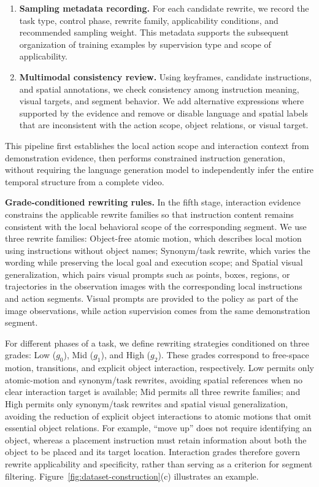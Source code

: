 \begin{enumerate}
\item \textbf{Sampling metadata recording.} For each candidate rewrite, we record the task type,
control phase, rewrite family, applicability conditions, and recommended sampling weight. This
metadata supports the subsequent organization of training examples by supervision type and scope
of applicability.

\item \textbf{Multimodal consistency review.} Using keyframes, candidate instructions, and spatial
annotations, we check consistency among instruction meaning, visual targets, and segment behavior.
We add alternative expressions where supported by the evidence and remove or disable language and
spatial labels that are inconsistent with the action scope, object relations, or visual target.
\end{enumerate}

This pipeline first establishes the local action scope and interaction context from demonstration
evidence, then performs constrained instruction generation, without requiring the language
generation model to independently infer the entire temporal structure from a complete video.

\textbf{Grade-conditioned rewriting rules.} In the fifth stage, interaction evidence constrains
the applicable rewrite families so that instruction content remains consistent with the local
behavioral scope of the corresponding segment. We use three rewrite families: Object-free atomic
motion, which describes local motion using instructions without object names; Synonym/task rewrite,
which varies the wording while preserving the local goal and execution scope; and Spatial visual
generalization, which pairs visual prompts such as points, boxes, regions, or trajectories in the
observation images with the corresponding local instructions and action segments. Visual prompts
are provided to the policy as part of the image observations, while action supervision comes from
the same demonstration segment.

\begingroup
\setlength{\intextsep}{0pt}
%

For different phases of a task, we define rewriting strategies conditioned on three grades: Low
($g_0$), Mid ($g_1$), and High ($g_2$). These grades correspond to free-space motion, transitions,
and explicit object interaction, respectively. Low permits only atomic-motion and synonym/task
rewrites, avoiding spatial references when no clear interaction target is available; Mid permits all
three rewrite families; and High permits only synonym/task rewrites and spatial visual
generalization, avoiding the reduction of explicit object interactions to atomic motions that omit
essential object relations. For example, ``move up'' does not require identifying an object, whereas
a placement instruction must retain information about both the object to be placed and its target
location. Interaction grades therefore govern rewrite applicability and specificity, rather than
serving as a criterion for segment filtering. Figure~\ref{fig:dataset-construction}(c) illustrates
an example.

